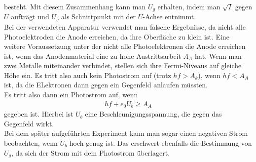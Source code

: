 besteht. Mit diesem Zusammenhang kann man $U_g$ erhalten, indem man $\sqrt{I}$ gegen
$U$ aufträgt und $U_g$ als Schnittpunkt mit der $U$-Achse entnimmt.\\
Bei der verwendeten Apparatur verwendet man falsche Ergebnisse, da nicht alle Photoelektroden
die Anode erreichen, da ihre Oberfläche zu klein ist. Eine weitere Voraussetzung unter der
nicht alle Photoelektronen die Anode erreichen ist, wenn das Anodenmaterial eine zu hohe
Austrittsarbeit $A_A$ hat. Wenn man zwei Metalle miteinander verbindet, stellen sich ihre
Fermi-Niveaus auf gleiche Höhe ein. Es tritt also auch kein Photostrom auf (trotz $hf > A_k$), wenn $hf < A_A$
ist, da die ELektronen dann gegen ein Gegenfeld anlaufen müssten.\\
Es tritt also dann ein Photostrom auf, wenn
\begin{align}
    \label{eqn:Aa}
    hf + e_0 U_b \geq A_A
\end{align}
gegeben ist. Hierbei ist $U_b$ eine Beschleunigungsspannung, die gegen das Gegenfeld
wirkt.\\
Bei dem später aufgeführten Experiment kann man sogar einen negativen
Strom beobachten, wenn $U_b$ hoch genug ist. Das erschwert ebenfalls die Bestimmung von $U_g$,
da sich der Strom mit dem Photostrom überlagert.\\
